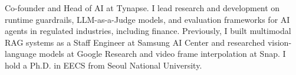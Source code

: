 

\begin{cvparagraph}

Co-founder and Head of AI at Tynapse. I lead research and development on runtime guardrails, LLM-as-a-Judge models, and evaluation frameworks for AI agents in regulated industries, including finance. Previously, I built multimodal RAG systems as a Staff Engineer at Samsung AI Center and researched vision-language models at Google Research and video frame interpolation at Snap. I hold a Ph.D. in EECS from Seoul National University.

\end{cvparagraph}
